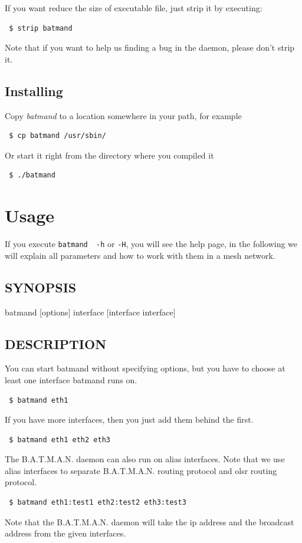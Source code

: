 \documentclass[
	12pt,
	a4paper,
	twoside,
	english,
	headsepline,
	footnosepline,
	automark,
	normalheadings,
	openany,
	cleardoubleplain,
	abstracton,
	idxtotoc,
	liststotoc,
	bibtotoc,
 	BCOR8mm,
]{scrartcl}
\begin{document}
If you want reduce the size of executable file, just strip it by executing: 

\begin{verbatim}
 $ strip batmand
\end{verbatim}

Note that if you want to help us finding a bug in the daemon, please don't strip it.

\subsection{Installing}
Copy \emph{batmand} to a location somewhere in your path, for example
\begin{verbatim}
 $ cp batmand /usr/sbin/
\end{verbatim}
Or start it right from the directory where you compiled it
\begin{verbatim}
 $ ./batmand
\end{verbatim}


\section{Usage}
If you execute \verb+batmand  -h+ or  \verb+-H+, you will see the help page, in the following we will explain  all parameters and how to work with them in a mesh network.

\subsection{SYNOPSIS}
\begin{verb}
batmand [options] interface [interface interface]
\end{verb}


\subsection{DESCRIPTION}
You can start batmand without specifying options, but you have to choose at least one interface batmand runs on.
\begin{verbatim}
 $ batmand eth1
\end{verbatim}
If you have more interfaces, then you just add them behind the first.
\begin{verbatim}
 $ batmand eth1 eth2 eth3
\end{verbatim}
The B.A.T.M.A.N. daemon can also run on alias interfaces. Note that we use alias interfaces to separate B.A.T.M.A.N. routing protocol and olsr routing  protocol.
\begin{verbatim}
 $ batmand eth1:test1 eth2:test2 eth3:test3
\end{verbatim}
Note that the B.A.T.M.A.N. daemon will take the ip address and the broadcast address from the  given interfaces.
\end{document}
